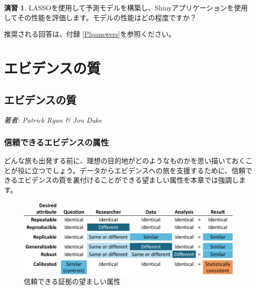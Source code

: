\documentclass[
  11pt]{book}
\theoremstyle{definition}
\theoremstyle{definition}
\theoremstyle{definition}
\newtheorem{exercise}{演習}[chapter]
\theoremstyle{definition}
\theoremstyle{remark}
\begin{document}
\begin{exercise}
\protect\hypertarget{exr:exercisePlp3}{}\label{exr:exercisePlp3}LASSOを使用して予測モデルを構築し、Shinyアプリケーションを使用してその性能を評価します。モデルの性能はどの程度ですか？
\end{exercise}

推奨される回答は、付録 \ref{Plpanswers}を参照ください。

\part{エビデンスの質}\label{part-ux30a8ux30d3ux30c7ux30f3ux30b9ux306eux8cea}

\chapter{エビデンスの質}\label{EvidenceQuality}

\emph{著者: Patrick Ryan \& Jon Duke}


\section{信頼できるエビデンスの属性}\label{ux4fe1ux983cux3067ux304dux308bux30a8ux30d3ux30c7ux30f3ux30b9ux306eux5c5eux6027}

どんな旅も出発する前に、理想の目的地がどのようなものかを思い描いておくことが役に立つでしょう。データからエビデンスへの旅を支援するために、信頼できるエビデンスの質を裏付けることができる望ましい属性を本章では強調します。

\begin{figure}

{\centering \includegraphics[width=1\linewidth]{images/EvidenceQuality/reliableevidenceattributes} 

}

\caption{信頼できる証拠の望ましい属性}\label{fig:attributesOfEvidence}
\end{figure}
\end{document}
